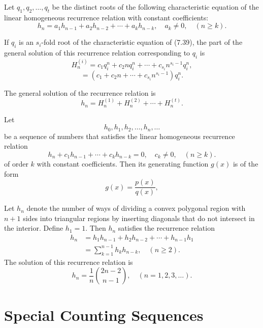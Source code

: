 \begin{theorem}
    \label{thm:7.4.2}
 Let $q_1, q_2, \dots, q_t$ be the distinct roots of the following characteristic equation of the linear homogeneous recurrence relation with constant coefficients:
\[
    h_n = a_1 h_{n-1} + a_2 h_{n-2} + \cdots + a_k h_{n-k}, \quad a_k \neq 0, \quad (n \geq k). \tag{7.39}
\]

If $q_i$ is an $s_i$-fold root of the characteristic equation of (7.39), the part of the general solution of this recurrence relation corresponding to $q_i$ is
\[
H_n^{(i)} = c_1 q_i^n + c_2 n q_i^n + \cdots + c_{s_i} n^{s_i-1} q_i^n,
\]
\[
= (c_1 + c_2 n + \cdots + c_{s_i} n^{s_i-1}) q_i^n.
\]

The general solution of the recurrence relation is
\[
h_n = H_n^{(1)} + H_n^{(2)} + \cdots + H_n^{(t)}.
\]

\end{theorem}



\begin{theorem}
    \label{thm:7.4.3}
Let 
\[
h_0, h_1, h_2, \dots, h_n, \dots
\]
be a sequence of numbers that satisfies the linear homogeneous recurrence relation
\[
    h_n + c_1 h_{n-1} + \cdots + c_k h_{n-k} = 0, \quad c_k \neq 0, \quad (n \geq k). \tag{7.42}
\]
of order $k$ with constant coefficients. Then its generating function $g(x)$ is of the form
\[
    g(x) = \frac{p(x)}{q(x)}, \tag{7.43}
\]
\end{theorem}



\begin{theorem}
\label{thm:7.6.1}
Let $h_n$ denote the number of ways of dividing a convex polygonal region with $n+1$ sides into triangular regions by inserting diagonals that do not intersect in the interior. Define $h_1 = 1$. Then $h_n$ satisfies the recurrence relation
\begin{align}
h_n &= h_1 h_{n-1} + h_2 h_{n-2} + \cdots + h_{n-1} h_1
\\
&= \sum_{k=1}^{n-1} h_k h_{n-k}, \quad (n \geq 2). \tag{7.54}
\end{align}
The solution of this recurrence relation is
\[
h_n = \frac{1}{n} \binom{2n-2}{n-1}, \quad (n = 1, 2, 3, \dots).
\]
\end{theorem}

\chapter{Special Counting Sequences}


